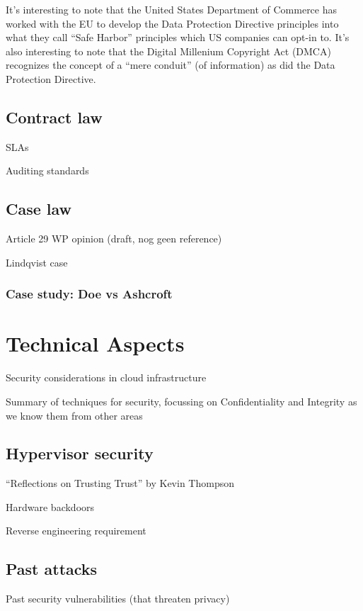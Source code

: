 \documentclass[11pt]{article}
\begin{document}
It's interesting to note that the United States Department of Commerce has worked with the EU to develop the Data Protection Directive principles into what they call ``Safe Harbor'' principles which US companies can opt-in to.
It's also interesting to note that the Digital Millenium Copyright Act (DMCA) recognizes the concept of a ``mere conduit'' (of information) as did the Data Protection Directive. \cite{congress1998digital}

\subsection{Contract law}
SLAs

Auditing standards

\subsection{Case law}
Article 29 WP opinion (draft, nog geen reference)

Lindqvist case

\subsubsection{Case study: Doe vs Ashcroft}
\cite{garlinger2009privacy, gorham2008national}

\section{Technical Aspects}
Security considerations in cloud infrastructure

Summary of techniques for security, focussing on Confidentiality and Integrity as we know them from other areas

\subsection{Hypervisor security}
``Reflections on Trusting Trust'' by Kevin Thompson \cite{thompson1984reflections}

Hardware backdoors \cite{sparks2009chipset, duflot2010limits}

Reverse engineering requirement
\cite{rutkowska2008bluepilling}

\subsection{Past attacks}
Past security vulnerabilities (that threaten privacy)
\cite{meer2009clobbering}
\end{document}
